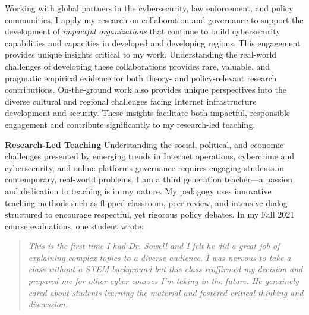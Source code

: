 \documentclass[11pt]{letter}
\begin{document}
\begin{letter}
%
Working with global partners in the cybersecurity, law enforcement, and policy communities, I apply my research on collaboration and governance to support the development of \emph{impactful organizations} that continue to build cybersecurity capabilities and capacities in developed and developing regions. 
%
This engagement provides unique insights critical to my work.
%
Understanding the real-world challenges of developing these collaborations provides rare, valuable, and pragmatic empirical evidence for both theory- and policy-relevant research contributions.
%
%
%
%
%
%
On-the-ground work also provides unique perspectives into the diverse cultural and regional challenges facing Internet infrastructure development and security.
%
These insights facilitate both impactful, responsible engagement and contribute significantly to my research-led teaching.


\textbf{Research-Led Teaching} \vspace{0.2 \baselineskip} \newline %
%
Understanding the social, political, and economic challenges presented by emerging trends in Internet operations, cybercrime and cybersecurity, and online platforms governance requires engaging students in contemporary, real-world problems.
%
I am a third generation teacher---a passion and dedication to teaching is in my nature.
%
My pedagogy uses innovative teaching methods such as flipped classroom, peer review, and intensive dialog structured to encourage respectful, yet rigorous policy debates.
%
In my Fall 2021 course evaluations, one student wrote:
%
\begin{quote}
  \emph{This is the first time I had Dr. Sowell and I felt he did a great job of explaining complex topics to a diverse audience. I was nervous to take a class without a STEM background but this class reaffirmed my decision and prepared me for other cyber courses I'm taking in the future. He genuinely cared about students learning the material and fostered critical thinking and discussion.}
\end{quote}


\end{letter}
\end{document}
